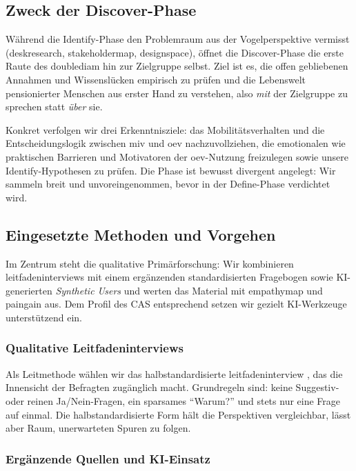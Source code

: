 \subsection{Zweck der Discover-Phase}

Während die Identify-Phase den Problemraum aus der Vogelperspektive vermisst (\gls{deskresearch}, \gls{stakeholdermap}, \gls{designspace}), öffnet die Discover-Phase die erste Raute des \gls{doublediam} hin zur Zielgruppe selbst. Ziel ist es, die offen gebliebenen Annahmen und Wissenslücken empirisch zu prüfen und die Lebenswelt pensionierter Menschen aus erster Hand zu verstehen, also \emph{mit} der Zielgruppe zu sprechen statt \emph{über} sie.

Konkret verfolgen wir drei Erkenntnisziele: das Mobilitätsverhalten und die Entscheidungslogik zwischen \gls{miv} und \gls{oev} nachzuvollziehen, die emotionalen wie praktischen Barrieren und Motivatoren der \gls{oev}-Nutzung freizulegen sowie unsere Identify-Hypothesen zu prüfen. Die Phase ist bewusst divergent angelegt: Wir sammeln breit und unvoreingenommen, bevor in der Define-Phase verdichtet wird.

\subsection{Eingesetzte Methoden und Vorgehen}

Im Zentrum steht die qualitative Primärforschung: Wir kombinieren \gls{leitfadeninterview}s mit einem ergänzenden standardisierten Fragebogen sowie KI-generierten \emph{Synthetic Users} und werten das Material mit \gls{empathymap} und \gls{paingain} aus. Dem Profil des CAS entsprechend setzen wir gezielt KI-Werkzeuge unterstützend ein.

\subsubsection{Qualitative Leitfadeninterviews}

Als Leitmethode wählen wir das halbstandardisierte \gls{leitfadeninterview} \parencite{blume2025}, das die Innensicht der Befragten zugänglich macht. Grundregeln sind: keine Suggestiv- oder reinen Ja/Nein-Fragen, ein sparsames ``Warum?'' und stets nur eine Frage auf einmal. Die halbstandardisierte Form hält die Perspektiven vergleichbar, lässt aber Raum, unerwarteten Spuren zu folgen.

\subsubsection{Ergänzende Quellen und KI-Einsatz}

